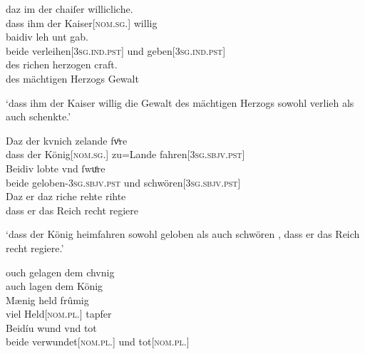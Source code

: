 \begin{exe}
\ex \label{ex:konjadjvvbeidiu}
	\begin{xlist}
	\ex \label{ex:konjadjvvbeidiu_1} %
		\gll daz im der chaiſer willicliche. \\
			dass ihm der Kaiser[\textsc{nom.sg.\MascM}] willig \\
	\sn \gll baidiv leh unt gab. \\
			beide verleihen[\textsc{3sg\subM.ind.pst}] und
			geben[\textsc{3sg\subM.ind.pst}] \\
	\sn \gll des richen herzogen craft. \\
			des mächtigen Herzogs Gewalt \\
		\begin{taggedline}{\parencites[\pno~73ra,19--21]{kc:A1}[vgl.][17108--17110]{schroeder1895}}
		\trans `dass ihm der Kaiser willig die Gewalt des mächtigen Herzogs sowohl verlieh als auch schenkte.'
		\end{taggedline}

	\ex \label{ex:konjadjvvbeidiu_2} %
		\gll Daz der kvnich zelande fvͦre \\
			dass der König[\textsc{nom.sg.\MascM}] zu=Lande
			fahren[\textsc{3sg\subM.sbjv.pst}] \\
	\sn \gll Beidiv lobte vnd ſwuͤre \\
			beide geloben-\textsc{3sg\subM.sbjv.pst} und
			schwören[\textsc{3sg\subM.sbjv.pst}] \\
	\sn \gll Daz er daz riche rehte rihte \\
			dass er das Reich recht regiere \\
		\begin{taggedline}{\parencites[\pno~102ra,43]{kc:VB}[zu][15366--15368]{schroeder1895}}
		\trans `dass der König heimfahren  sowohl geloben als
			auch schwören , dass er das Reich recht regiere.'
		\end{taggedline}

	\ex \label{ex:konjadjvvbeidiu_3} %
		\begin{taggedline}{\parencites[\pno~42vb,42--44]{kc:B1}[vgl.][15880--15882]{schroeder1895}}
		\gll ouch gelagen dem chvnig \\
			auch lagen dem König \\
	\sn \gll Mænig held frûmig \\
			viel Held[\textsc{nom.pl.\MascM}] tapfer \\
	\sn \gll Beidíu wund vnd tot \\
			beide verwundet[\textsc{nom.pl.\MascM}] und tot[\textsc{nom.pl.\MascM}] \\
		\end{taggedline}


\end{xlist}
\end{exe}
